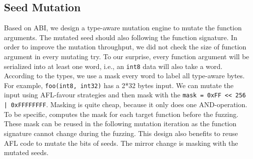\subsection{Seed Mutation}
Based on ABI, we design a type-aware mutation engine to mutate the function arguments. 
The mutated seed should also following the function signature.
%
In order to improve the mutation throughput, we did not check the size of function argument in every mutating try. 
To our surprise, every function argument will be serialized into at least one word, i.e., an \texttt{int8} data will also take a word.
According to the types, we use a mask every word to label all type-aware bytes.
For example, \texttt{foo(int8, int32)} has a 2*32 bytes input. We can mutate the input using AFL-favour strategies and then mask with the \texttt{mask = 0xFF << 256 | 0xFFFFFFFF}. Masking is quite cheap, because it only does one AND-operation.
To be specific, {\tool} computes the mask for each target function before the fuzzing. These mask can be reused in the following mutation iteration as the function signature cannot change during the fuzzing. 
This design also benefits {\tool} to reuse AFL code to mutate the bits of seeds. The mirror change is masking with the mutated seeds.
